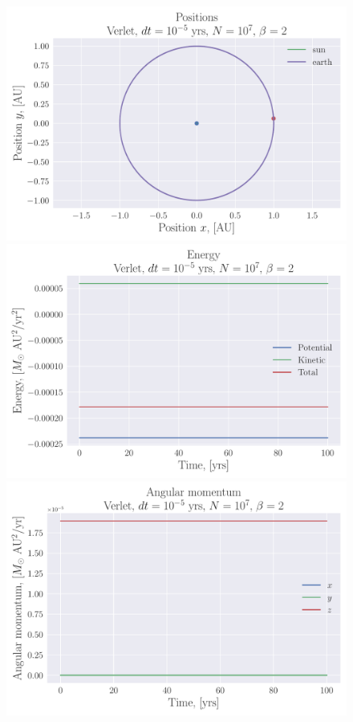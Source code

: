 \documentclass[reprint, english,notitlepage,nofootinbib]{revtex4-1}  %
\begin{document}
\begin{figure}
  \includegraphics[width=\linewidth]{../output/earth_sun_circ-verlet-5-7-2.pdf}
  \includegraphics[width=\linewidth]{../output/earth_sun_circ-verlet-5-7-2_energy.pdf}
  \includegraphics[width=\linewidth]{../output/earth_sun_circ-verlet-5-7-2_ang_mom.pdf}
  \caption{}
  \label{fig:earth_sun_circ_verlet}
\end{figure}
\end{document}
